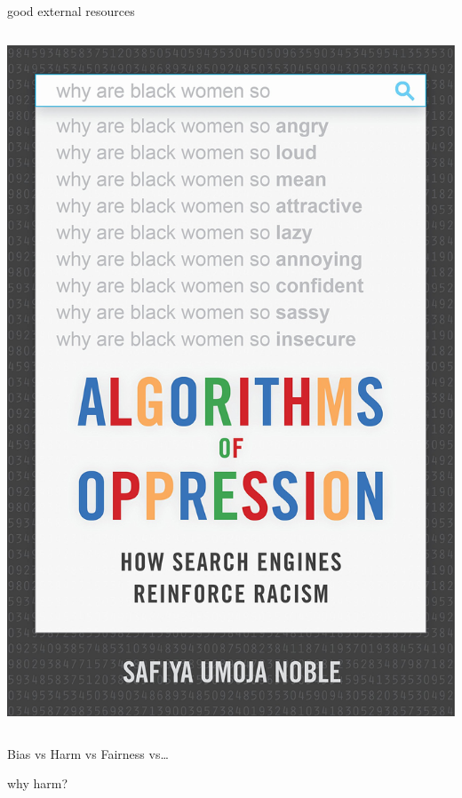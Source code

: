 \documentclass[aspectratio=43,17pt]{beamer} %
\begin{document}
\begin{frame}{good external resources}
\begin{columns}
\begin{column}{0.33\textwidth}
\includegraphics[width=\textwidth]{figures/books/Algorithms_of_Oppression.jpeg}
\end{column}
\end{columns}

\end{frame}

\begin{frame}[standout]

Bias vs Harm vs Fairness vs\dots

\end{frame}


\begin{frame}{why harm?}




\end{frame}
\end{document}
